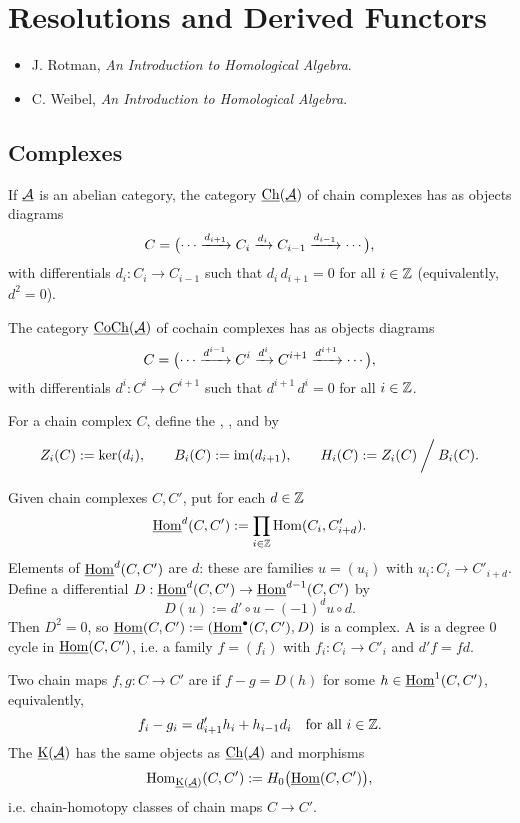 
\chapter{Resolutions and Derived Functors}

\begin{itemize}
	\item J. Rotman, \textit{An Introduction to Homological Algebra}.
	\item C. Weibel, \textit{An Introduction to Homological Algebra}.
\end{itemize}

\section{Complexes}

\begin{definitions*}
	\item If \( \underline{\mathcal A} \) is an abelian category, the category \( \operatorname{\underline{\mathrm{Ch}}}(\underline{\mathcal A}) \) of chain complexes has as objects diagrams
		\[
			C = \bigl( \dotsm \xrightarrow{d_{i+1}} C_i \xrightarrow{d_i} C_{i-1} \xrightarrow{d_{i-1}} \dotsm \bigr),
		\]
		with differentials \( d_i: C_i \to C_{i-1} \) such that \( d_i\, d_{i+1} = 0 \) for all \( i \in \mathbb{Z} \) (equivalently, \( d^2 = 0 \)).
	\item The category \( \operatorname{\underline{\mathrm{CoCh}}}(\underline{\mathcal A}) \) of cochain complexes has as objects diagrams
		\[
			C = \bigl( \dotsm \xrightarrow{d^{i-1}} C^{i} \xrightarrow{d^{i}} C^{i+1} \xrightarrow{d^{i+1}} \dotsm \bigr),
		\]
		with differentials \( d^{i}: C^{i} \to C^{i+1} \) such that \( d^{i+1}\, d^{i} = 0 \) for all \( i \in \mathbb{Z} \).
	\item For a chain complex \( C \), define the , , and  by
		\[
			Z_i(C) := \ker(d_i), \qquad B_i(C) := \operatorname{im}(d_{i+1}), \qquad H_i(C) := Z_i(C) \mathbin{\bigg/} B_i(C) .
		\]
	\item Given chain complexes \( C, C' \), put for each \( d \in \mathbb{Z} \)
		\[
			\operatorname{\underline{\mathrm{Hom}}}^{d}(C, C') := \prod_{i \in \mathbb{Z}} \operatorname{Hom}(C_i, C'_{i+d}).
		\]
		Elements of \( \operatorname{\underline{\mathrm{Hom}}}^{d}(C, C') \) are  \( d \): these are families \( u = (u_i) \) with \( u_i: C_i \to C'_{i+d} \). Define a differential \( D: \operatorname{\underline{\mathrm{Hom}}}^{d}(C, C') \to \operatorname{\underline{\mathrm{Hom}}}^{d-1}(C, C') \) by
		\[
			D(u) := d' \circ u - (-1)^{d} u \circ d .
		\]
		Then \( D^2 = 0 \), so \( \operatorname{\underline{\mathrm{Hom}}}(C, C') := (\operatorname{\underline{\mathrm{Hom}}}^{\bullet}(C, C'), D) \) is a complex. A  is a degree \( 0 \) cycle in \( \operatorname{\underline{\mathrm{Hom}}}(C, C') \), i.e. a family \( f = (f_i) \) with \( f_i: C_i \to C'_i \) and \( d' f = f d \).
	\item Two chain maps \( f, g: C \to C' \) are  if \( f - g = D(h) \) for some \( h \in \operatorname{\underline{\mathrm{Hom}}}^{1}(C, C') \), equivalently,
		\[
			f_i - g_i = d'_{i+1} h_i + h_{i-1} d_i \quad \text{for all } i \in \mathbb{Z} .
		\]
		The  \( \operatorname{\underline{\mathrm{K}}}(\underline{\mathcal A}) \) has the same objects as \( \operatorname{\underline{\mathrm{Ch}}}(\underline{\mathcal A}) \) and morphisms
		\[
			\operatorname{Hom}_{\operatorname{\underline{\mathrm{K}}}(\underline{\mathcal A})}(C, C') := H_0\bigl(\operatorname{\underline{\mathrm{Hom}}}(C, C')\bigr) ,
		\]
		i.e. chain-homotopy classes of chain maps \( C \to C' \).
\end{definitions*}

